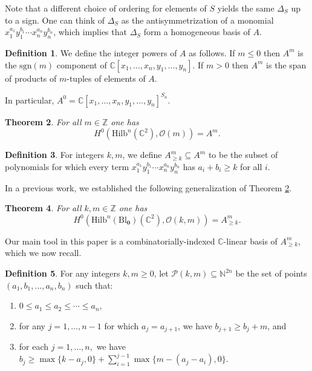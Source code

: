 \documentclass[12pt]{amsart}
\newcommand{\Hilb}{\mathrm{Hilb}}
\newcommand{\C}{\mathbb{C}}
\newcommand{\Z}{\mathbb{Z}}
\newcommand{\N}{\mathbb{N}}
\newcommand{\CO}{\mathcal{O}}
\newcommand{\sgn}{\mathrm{sgn}}
\newcommand{\Bl}{\mathrm{Bl}}
\numberwithin{equation}{section}
\newtheorem{theorem}{Theorem}[section]
\theoremstyle{definition}
\newtheorem{definition}[theorem]{Definition}
\begin{document}
Note that a different choice of ordering for elements of $S$ yields the same $\Delta_S$ up to a sign. One can think of $\Delta_S$ as the antisymmetrization of a monomial $x_1^{a_1}y_1^{b_1}\cdots x_n^{a_n}y_n^{b_n}$, which implies that $\Delta_S$ form a homogeneous basis of $A$. 

\begin{definition}
We define the integer powers of $A$ as follows. If $m\le 0$ then $A^m$ is the $\sgn(m)$ component of $\C[x_1,\ldots,x_n,y_1,\ldots,y_n]$. If $m>0$ then $A^m$ is the span of products of $m$-tuples of elements of $A$.
\end{definition}

In particular, $A^0=\C[x_1,\ldots,x_n,y_1,\ldots,y_n]^{S_n}$. %

\begin{theorem}\cite{Haiman,Haimanqt}\label{thm:secC2HS}
For all $m\in \Z$ one has
$$
H^0(\Hilb^n(\C^2),\CO(m))=A^m.
$$
\end{theorem}

\begin{definition}
    For integers $k,m$, we define $A^m_{\geq k}\subseteq A^m$ to be the subset of polynomials for which every term $x_1^{a_1}y_1^{b_1}\cdots x_n^{a_n}y_n^{b_n}$ has $a_i+b_i\geq k$ for all $i$.
\end{definition}

In a previous work, we established the following generalization of Theorem \ref{thm:secC2HS}.

\begin{theorem}\cite{CGOT}
    For all $k,m\in \Z$ one has
    \[ H^0(\Hilb^n(\Bl_{\mathbf{0}})(\C^2),\CO(k,m)) = A^m_{\geq k}. \]
\end{theorem}

Our main tool in this paper is a combinatorially-indexed $\C$-linear basis of $A^m_{\geq k}$, which we now recall.

\begin{definition}\label{def:P(k,m)}
    For any integers $k,m\geq0$, let $\mathcal{P}(k,m)\subseteq\N^{2n}$ be the set of points $(a_1,b_1,\dots,a_n,b_n)$ such that:
    \begin{enumerate}
        \item $0\leq a_1\leq a_2 \leq \cdots \leq a_n$,
        \item for any $j=1,\dots,n-1$ for which $a_j = a_{j+1}$, we have $b_{j+1}\geq b_j+m$, and
        \item for each $j=1,\dots,n,$ we have $b_j\geq \max\{k-a_j,0\} + \sum_{i=1}^{j-1}\max\{m-(a_j-a_i),0\}.$
    \end{enumerate}
\end{definition}
\end{document}

